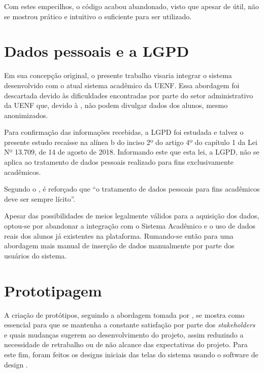 Com estes empecilhos, o código acabou abandonado, visto que apesar de útil, não se mostrou prático e intuitivo o suficiente para ser utilizado.

\section{Dados pessoais e a LGPD} %

Em sua concepção original, o presente trabalho visaria integrar o sistema desenvolvido com o atual sistema acadêmico da UENF. Essa abordagem foi descartada devido às dificuldades encontradas por parte do setor administrativo da UENF que, devido à , não podem divulgar dados dos alunos, mesmo anonimizados.

Para confirmação das informações recebidas, a LGPD foi estudada e talvez o presente estudo recaísse na alínea b do inciso 2º do artigo 4º do capítulo 1 da Lei Nº 13.709, de 14 de agosto de 2018. Informando este que esta lei, a LGPD, não se aplica ao tratamento de dados pessoais realizado para fins exclusivamente acadêmicos.

Segundo o , é reforçado que ``o tratamento de dados pessoais para fins acadêmicos deve ser sempre lícito''.

Apesar das possibilidades de meios legalmente válidos para a aquisição dos dados, optou-se por abandonar a integração com o Sistema Acadêmico e o uso de dados reais dos alunos já existentes na plataforma. Rumando-se então para uma abordagem mais manual de inserção de dados manualmente por parte dos usuários do sistema.

\section{Prototipagem} %

A criação de protótipos, seguindo a abordagem tomada por , se mostra como essencial para que se mantenha a constante satisfação por parte dos \textit{stakeholders} e quais mudanças sugerem ao desenvolvimento do projeto, assim reduzindo a necessidade de retrabalho ou de não alcance das expectativas do projeto. Para este fim, foram feitos os designs iniciais das telas do sistema usando o software de design .

